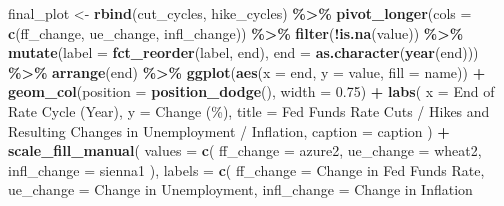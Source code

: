 \documentclass[
]{article}
\newenvironment{Shaded}{\begin{snugshade}}{\end{snugshade}}
\newcommand{\AttributeTok}[1]{\textcolor[rgb]{0.13,0.29,0.53}{#1}}
\newcommand{\FloatTok}[1]{\textcolor[rgb]{0.00,0.00,0.81}{#1}}
\newcommand{\FunctionTok}[1]{\textcolor[rgb]{0.13,0.29,0.53}{\textbf{#1}}}
\newcommand{\NormalTok}[1]{#1}
\newcommand{\OtherTok}[1]{\textcolor[rgb]{0.56,0.35,0.01}{#1}}
\newcommand{\SpecialCharTok}[1]{\textcolor[rgb]{0.81,0.36,0.00}{\textbf{#1}}}
\newcommand{\StringTok}[1]{\textcolor[rgb]{0.31,0.60,0.02}{#1}}
\begin{document}
\begin{Shaded}
\begin{Highlighting}[]
\NormalTok{final\_plot }\OtherTok{\textless{}{-}} \FunctionTok{rbind}\NormalTok{(cut\_cycles, hike\_cycles) }\SpecialCharTok{\%\textgreater{}\%}
  \FunctionTok{pivot\_longer}\NormalTok{(}\AttributeTok{cols =} \FunctionTok{c}\NormalTok{(ff\_change, ue\_change, infl\_change)) }\SpecialCharTok{\%\textgreater{}\%}
  \FunctionTok{filter}\NormalTok{(}\SpecialCharTok{!}\FunctionTok{is.na}\NormalTok{(value)) }\SpecialCharTok{\%\textgreater{}\%}
  \FunctionTok{mutate}\NormalTok{(}\AttributeTok{label =} \FunctionTok{fct\_reorder}\NormalTok{(label, end), }\AttributeTok{end =} \FunctionTok{as.character}\NormalTok{(}\FunctionTok{year}\NormalTok{(end))) }\SpecialCharTok{\%\textgreater{}\%}
  \FunctionTok{arrange}\NormalTok{(end) }\SpecialCharTok{\%\textgreater{}\%}
  \FunctionTok{ggplot}\NormalTok{(}\FunctionTok{aes}\NormalTok{(}\AttributeTok{x =}\NormalTok{ end, }\AttributeTok{y =}\NormalTok{ value, }\AttributeTok{fill =}\NormalTok{ name)) }\SpecialCharTok{+}
  \FunctionTok{geom\_col}\NormalTok{(}\AttributeTok{position =} \FunctionTok{position\_dodge}\NormalTok{(), }\AttributeTok{width =} \FloatTok{0.75}\NormalTok{) }\SpecialCharTok{+}
  \FunctionTok{labs}\NormalTok{(}
    \AttributeTok{x =} \StringTok{\textquotesingle{}End of Rate Cycle (Year)\textquotesingle{}}\NormalTok{, }\AttributeTok{y =} \StringTok{\textquotesingle{}Change (\%)\textquotesingle{}}\NormalTok{, }
    \AttributeTok{title =} \StringTok{\textquotesingle{}Fed Funds Rate Cuts / Hikes and Resulting Changes in Unemployment / Inflation\textquotesingle{}}\NormalTok{,}
    \AttributeTok{caption =}\NormalTok{ caption}
\NormalTok{  ) }\SpecialCharTok{+}
  \FunctionTok{scale\_fill\_manual}\NormalTok{(}
    \AttributeTok{values =} \FunctionTok{c}\NormalTok{(}
      \StringTok{\textquotesingle{}ff\_change\textquotesingle{}} \OtherTok{=} \StringTok{\textquotesingle{}azure2\textquotesingle{}}\NormalTok{,}
      \StringTok{\textquotesingle{}ue\_change\textquotesingle{}} \OtherTok{=} \StringTok{\textquotesingle{}wheat2\textquotesingle{}}\NormalTok{,}
      \StringTok{\textquotesingle{}infl\_change\textquotesingle{}} \OtherTok{=} \StringTok{\textquotesingle{}sienna1\textquotesingle{}}
\NormalTok{    ),}
    \AttributeTok{labels =} \FunctionTok{c}\NormalTok{(}
      \StringTok{\textquotesingle{}ff\_change\textquotesingle{}} \OtherTok{=} \StringTok{\textquotesingle{}Change in Fed Funds Rate\textquotesingle{}}\NormalTok{,}
      \StringTok{\textquotesingle{}ue\_change\textquotesingle{}} \OtherTok{=} \StringTok{\textquotesingle{}Change in Unemployment\textquotesingle{}}\NormalTok{,}
      \StringTok{\textquotesingle{}infl\_change\textquotesingle{}} \OtherTok{=} \StringTok{\textquotesingle{}Change in Inflation\textquotesingle{}}

\end{Highlighting}
\end{Shaded}
\end{document}

